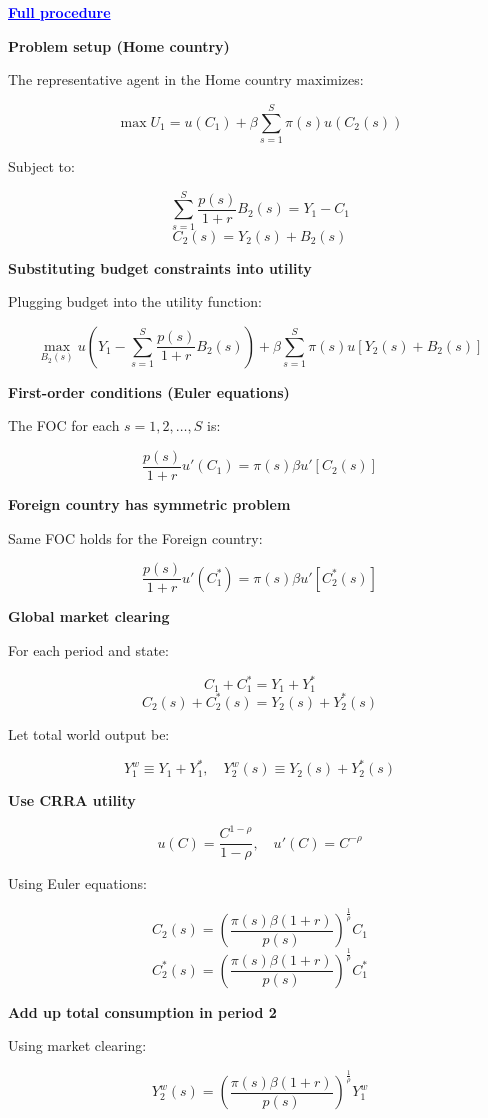 \documentclass[12pt]{article}
\begin{document}
\textcolor{blue}{\textbf{\uline{Full procedure}}}

\textbf{Problem setup (Home country)}

The representative agent in the Home country maximizes:

\[
\max U_1 = u(C_1) + \beta \sum_{s=1}^{S} \pi(s) u(C_2(s))
\]

Subject to:

\[
\sum_{s=1}^S \frac{p(s)}{1 + r} B_2(s) = Y_1 - C_1 \tag{14}
\]
\[
C_2(s) = Y_2(s) + B_2(s)
\]

\textbf{Substituting budget constraints into utility}

Plugging budget into the utility function:

\[
\max_{B_2(s)} u\left( Y_1 - \sum_{s=1}^{S} \frac{p(s)}{1 + r} B_2(s) \right) + \beta \sum_{s=1}^{S} \pi(s) u\left[ Y_2(s) + B_2(s) \right]
\]

\textbf{First-order conditions (Euler equations)}

The FOC for each $s = 1, 2, \dots, S$ is:

\[
\frac{p(s)}{1 + r} u'(C_1) = \pi(s) \beta u'\left[ C_2(s) \right] \tag{15}
\]

\textbf{Foreign country has symmetric problem}

Same FOC holds for the Foreign country:

\[
\frac{p(s)}{1 + r} u'(C_1^*) = \pi(s) \beta u'\left[ C_2^*(s) \right]
\]

\textbf{Global market clearing}

For each period and state:

\[
C_1 + C_1^* = Y_1 + Y_1^* \tag{16a}
\]
\[
C_2(s) + C_2^*(s) = Y_2(s) + Y_2^*(s) \tag{16b}
\]

Let total world output be:

\[
Y_1^w \equiv Y_1 + Y_1^*, \quad Y_2^w(s) \equiv Y_2(s) + Y_2^*(s)
\]

\textbf{Use CRRA utility}

\[
u(C) = \frac{C^{1 - \rho}}{1 - \rho}, \quad u'(C) = C^{-\rho}
\]

Using Euler equations:

\[
C_2(s) = \left( \frac{\pi(s)\beta(1 + r)}{p(s)} \right)^{\frac{1}{\rho}} C_1 \tag{17a}
\]
\[
C_2^*(s) = \left( \frac{\pi(s)\beta(1 + r)}{p(s)} \right)^{\frac{1}{\rho}} C_1^* \tag{17b}
\]

\textbf{Add up total consumption in period 2}

Using market clearing:

\[
Y_2^w(s) = \left( \frac{\pi(s)\beta(1 + r)}{p(s)} \right)^{\frac{1}{\rho}} Y_1^w \tag{18}
\]
\end{document}
